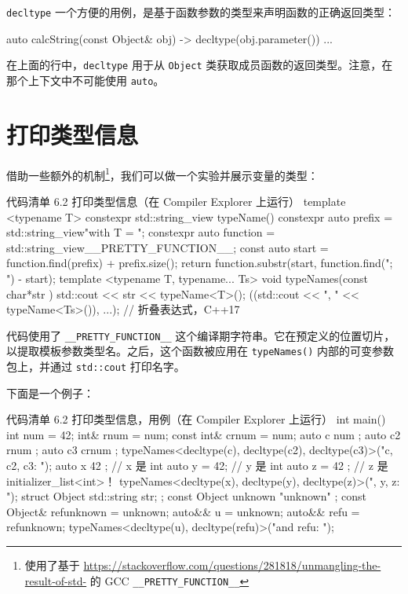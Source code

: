 \texttt{decltype} 一个方便的用例，是基于函数参数的类型来声明函数的正确返回类型：

\begin{codebox}[cpp]
auto calcString(const Object& obj) -> decltype(obj.parameter()) { ... }
\end{codebox}

在上面的行中，\texttt{decltype} 用于从 \texttt{Object} 类获取成员函数的返回类型。注意，在那个上下文中不可能使用 \texttt{auto}。

\section{打印类型信息}

借助一些额外的机制\footnote{使用了基于 \url{https://stackoverflow.com/questions/281818/unmangling-the-result-of-std-} 的 GCC \texttt{\_\_PRETTY\_FUNCTION\_\_}}，我们可以做一个实验并展示变量的类型：

\begin{codeboxt}[cpp]{代码清单 6.2 打印类型信息（在 Compiler Explorer 上运行）}
template <typename T>
constexpr std::string_view typeName()
{
constexpr auto prefix = std::string_view{"with T = "};
constexpr auto function = std::string_view{__PRETTY_FUNCTION__};
const auto start = function.find(prefix) + prefix.size();
return function.substr(start, function.find("; ") - start);
}
template <typename T, typename... Ts>
void typeNames(const char*str ) {
std::cout << str << typeName<T>();
((std::cout << ", " << typeName<Ts>()), ...); // 折叠表达式，C++17
}
\end{codeboxt}

代码使用了 \texttt{\_\_PRETTY\_FUNCTION\_\_} 这个编译期字符串。它在预定义的位置切片，以提取模板参数类型名。之后，这个函数被应用在 \texttt{typeNames()} 内部的可变参数包上，并通过 \texttt{std::cout} 打印名字。

下面是一个例子：

\begin{codeboxt}[cpp]{代码清单 6.2 打印类型信息，用例（在 Compiler Explorer 上运行）}
int main() {
int num = 42;
int& rnum = num;
const int& crnum = num;
auto c { num };
auto c2 { rnum };
auto c3 { crnum };
typeNames<decltype(c), decltype(c2), decltype(c3)>("c, c2, c3: ");
auto x { 42 };
// x 是 int
auto y = 42;
// y 是 int
auto z = { 42 };
// z 是 initializer_list<int>！
typeNames<decltype(x), decltype(y), decltype(z)>("\nx, y, z: ");
struct Object { std::string str; };
const Object unknown { "unknown" };
const Object& refunknown = unknown;
auto&& u = unknown;
auto&& refu = refunknown;
typeNames<decltype(u), decltype(refu)>("\nu and refu: ");
}
\end{codeboxt}

